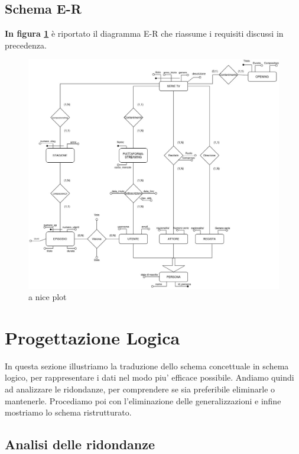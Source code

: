 \documentclass[12pt,a4paper]{article}
\begin{document}
\subsection{Schema E-R}
\textbf{In figura \ref{fig:no-ristrutt}} è riportato il diagramma E-R che riassume i requisiti discussi in precedenza.
\begin{figure}[h]
    \centering
    \includegraphics[scale=0.4]{schema-no-ristrutt.jpg}
    \caption{a nice plot}
    \label{fig:no-ristrutt}
\end{figure}
\section{Progettazione Logica}
In questa sezione illustriamo la traduzione dello schema concettuale in schema logico, per rappresentare i dati nel modo piu' efficace possibile. 
Andiamo quindi ad analizzare le ridondanze, per comprendere se sia preferibile eliminarle o mantenerle. 
Procediamo poi con l'eliminazione delle generalizzazioni e infine mostriamo lo schema ristrutturato.
\subsection{Analisi delle ridondanze}
\end{document}
